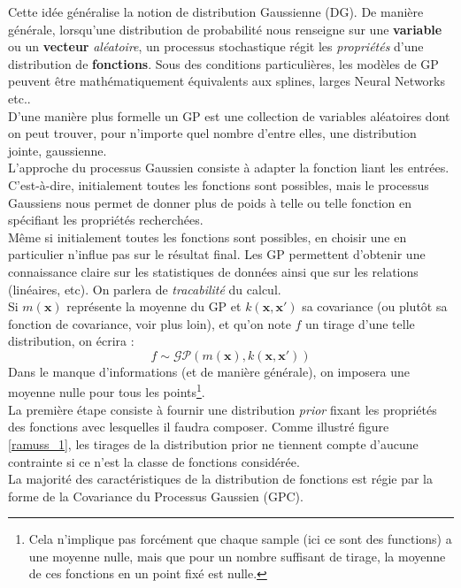 \documentclass[a4paper,12pt]{report}
\newcommand{\bepar}[1]{
	\left( #1 \right)  
}
\numberwithin{equation}{section} %
\begin{document}
\noindent Cette idée généralise la notion de distribution Gaussienne (DG). De manière générale, lorsqu'une distribution de probabilité nous renseigne sur une \textbf{variable} ou un \textbf{vecteur} \textit{aléatoire}, un processus stochastique régit les \textit{propriétés} d'une distribution de \textbf{fonctions}. Sous des conditions particulières, les modèles de GP peuvent être mathématiquement équivalents aux splines, larges Neural Networks etc.. \\ 
D'une manière plus formelle un GP est une collection de variables aléatoires dont on peut trouver, pour n'importe quel nombre d'entre elles, une distribution jointe, gaussienne.\\
L'approche du processus Gaussien consiste à adapter la fonction liant les entrées. C'est-à-dire, initialement toutes les fonctions sont possibles, mais le processus Gaussiens nous permet de donner plus de poids à telle ou telle fonction en spécifiant les propriétés recherchées.\\
Même si initialement toutes les fonctions sont possibles, en choisir une en particulier n'influe pas sur le résultat final. Les GP permettent d'obtenir une connaissance claire sur les statistiques de données ainsi que sur les relations (linéaires, etc). On parlera de \textit{tracabilité} du calcul. \\

Si $m(\textbf{x})$ représente la moyenne du GP et $k\bepar{\textbf{x}, \textbf{x}'}$ sa covariance (ou plutôt sa fonction de covariance, voir plus loin), et qu'on note $f$ un tirage d'une telle distribution, on écrira :
\begin{equation}
f \sim \mathcal{GP}\bepar{m(\textbf{x}), k\bepar{\textbf{x}, \textbf{x}'}}
\end{equation}
Dans le manque d'informations (et de manière générale), on imposera une moyenne nulle pour tous les points\footnote{Cela n'implique pas forcément que chaque sample (ici ce sont des functions) a une moyenne nulle, mais que pour un nombre suffisant de tirage, la moyenne de ces fonctions en un point fixé est nulle.}. \\ 
La première étape consiste à fournir une distribution \textit{prior} fixant les propriétés des fonctions avec lesquelles il faudra composer. Comme illustré figure \eqref{ramuss_1}, les tirages de la distribution prior ne tiennent compte d'aucune contrainte si ce n'est la classe de fonctions considérée. \\
La majorité des caractéristiques de la distribution de fonctions est régie par la forme de la Covariance du Processus Gaussien (GPC). \\
\end{document}
